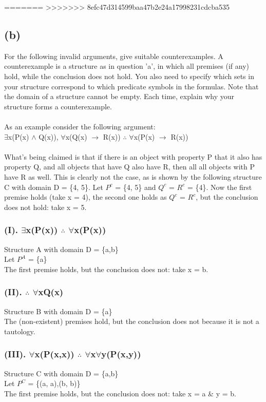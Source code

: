 \documentclass[a4paper]{article}
\begin{document}
=======
>>>>>>> 8efc47d314599baa47b2e24a17998231cdcba535
\newpage
\subsection{(b)}
For the following invalid arguments, give suitable counterexamples. A counterexample is a structure
as in question 'a', in which all premises (if any) hold, while the conclusion does not hold. You also
need to specify which sets in your structure correspond to which predicate symbols in the formulas.
Note that the domain of a structure cannot be empty. Each time, explain why your structure forms
a counterexample.
\\\\
As an example consider the following argument:\\
$\exists $x(P(x) $\wedge $ Q(x)), $\forall $x(Q(x) $\rightarrow $ R(x)) $\therefore $ $\forall $x(P(x) $\rightarrow $ R(x))
\\\\
What's being claimed is that if there is an object with property P that it also has property Q, and
all objects that have Q also have R, then all all objects with P have R as well. This is clearly not
the case, as is shown by the following structure C with domain D = \{4, 5\}. Let $P^c$ = \{4, 5\} and
$Q^c$ = $R^c$ = \{4\}. Now the first premise holds (take x = 4), the second one holds as $Q^c$ = $R^c$, but
the conclusion does not hold: take x = 5.\\
\subsubsection{(I). $\exists $x(P(x)) $\therefore $ $\forall $x(P(x))}
Structure A with domain D = \{a,b\}\\
Let $P^A$ = \{a\}\\
The first premise holds, but the conclusion does not: take x = b.
\subsubsection{(II). $\therefore $ $\forall $xQ(x)}
Structure B with domain D = \{a\}\\
The (non-existent) premises hold, but the conclusion does not because it is not a tautology.

\subsubsection{(III). $\forall $x(P(x,x)) $\therefore $ $\forall $x$\forall $y(P(x,y))}
Structure C with domain D = \{a,b\}\\
Let $P^C$ = \{(a, a),(b, b)\}\\
The first premise holds, but the conclusion does not: take x = a \& y = b.
\end{document}
